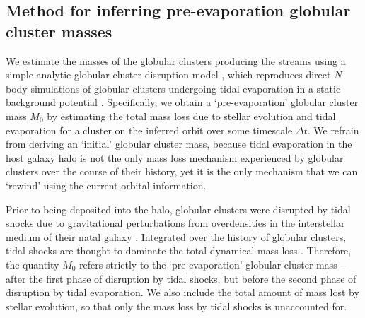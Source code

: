 \documentclass[twocolumn]{aastex63}
\begin{document}
\subsection{Method for inferring pre-evaporation globular cluster masses}
We estimate the masses of the globular clusters producing the streams using a simple analytic globular cluster disruption model \citep{lamers05}, which reproduces direct $N$-body simulations of globular clusters undergoing tidal evaporation in a static background potential \citep{baumgardt03}.
Specifically, we obtain a `pre-evaporation' globular cluster mass $M_0$ by estimating the total mass loss due to stellar evolution and tidal evaporation for a cluster on the inferred orbit over some timescale $\Delta t$.
We refrain from deriving an `initial' globular cluster mass, because tidal evaporation in the host galaxy halo is not the only mass loss mechanism experienced by globular clusters over the course of their history, yet it is the only mechanism that we can `rewind' using the current orbital information.

Prior to being deposited into the halo, globular clusters were disrupted by tidal shocks due to gravitational perturbations from overdensities in the interstellar medium of their natal galaxy \citep[e.g.][]{gieles06,elmegreen:2010b,kruijssen11,miholics17,pfeffer:2018}.
Integrated over the history of globular clusters, tidal shocks are thought to dominate the total dynamical mass loss \citep[e.g.][]{kruijssen15b}.
Therefore, the quantity $M_0$ refers strictly to the `pre-evaporation' globular cluster mass -- after the first phase of disruption by tidal shocks, but before the second phase of disruption by tidal evaporation.
We also include the total amount of mass lost by stellar evolution, so that only the mass loss by tidal shocks is unaccounted for.
\end{document}

